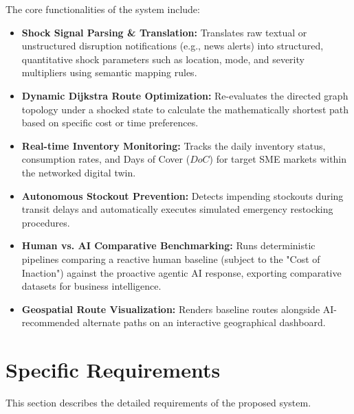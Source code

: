 The core functionalities of the system include:
\begin{itemize}
    \item \textbf{Shock Signal Parsing \& Translation:} Translates raw textual or unstructured disruption notifications (e.g., news alerts) into structured, quantitative shock parameters such as location, mode, and severity multipliers using semantic mapping rules.
    \item \textbf{Dynamic Dijkstra Route Optimization:} Re-evaluates the directed graph topology under a shocked state to calculate the mathematically shortest path based on specific cost or time preferences.
    \item \textbf{Real-time Inventory Monitoring:} Tracks the daily inventory status, consumption rates, and Days of Cover ($DoC$) for target SME markets within the networked digital twin.
    \item \textbf{Autonomous Stockout Prevention:} Detects impending stockouts during transit delays and automatically executes simulated emergency restocking procedures.
    \item \textbf{Human vs. AI Comparative Benchmarking:} Runs deterministic pipelines comparing a reactive human baseline (subject to the "Cost of Inaction") against the proactive agentic AI response, exporting comparative datasets for business intelligence.
    \item \textbf{Geospatial Route Visualization:} Renders baseline routes alongside AI-recommended alternate paths on an interactive geographical dashboard.
\end{itemize}
\section[Specific Requirements]{Specific Requirements}
This section describes the detailed requirements of the proposed system.
